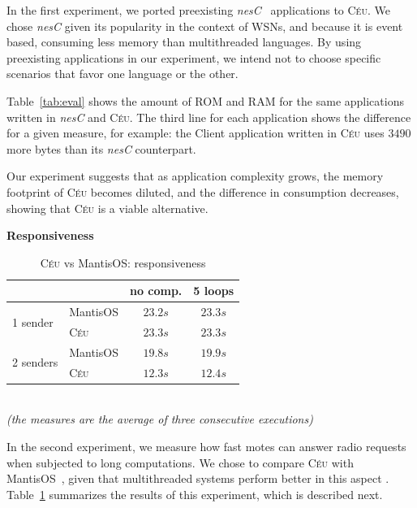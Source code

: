 \documentclass[11pt,a4paper]{article}
\newcommand{\2}{\;\;}
\newcommand{\5}{\;\;\;\;\;}
\newcommand{\CEU}{\textsc{C\'{e}u}}
\newcommand{\nesc}{\emph{nesC}}
\begin{document}
In the first experiment, we ported preexisting \nesc{}~\cite{wsn.nesc} 
applications to \CEU.
We chose \nesc{} given its popularity in the context of WSNs, and because it is 
event based, consuming less memory than multithreaded languages.
By using preexisting applications in our experiment, we intend not to choose 
specific scenarios that favor one language or the other.

Table~\ref{tab:eval} shows the amount of ROM and RAM for the same applications 
written in \nesc{} and \CEU{}.
The third line for each application shows the difference for a given measure, 
for example: the Client application written in \CEU{} uses $3490$ more bytes 
than its \nesc{} counterpart.

Our experiment suggests that as application complexity grows, the memory 
footprint of \CEU{} becomes diluted, and the difference in consumption 
decreases, showing that \CEU{} is a viable alternative.


\textbf{Responsiveness}

\begin{table}[t]\small
\begin{center}
\begin{tabular}{ | l | l | c | c | }
\hline
\multicolumn{2}{|c|}{}
               & no comp. &    5 loops \\
\hline\hline
\multirow{2}{*}{1 sender}
    & MantisOS &  $23.2s$ &    $23.3s$ \\
    & \CEU     &  $23.3s$ &    $23.3s$ \\
\hline\hline
\multirow{2}{*}{2 senders}
    & MantisOS &  $19.8s$ &   $19.9s$ \\
    & \CEU     &  $12.3s$ &   $12.4s$ \\
\hline
\end{tabular}
\\
{\scriptsize\emph{(the measures are the average of three consecutive 
executions)}}
\caption{\CEU{} vs MantisOS: responsiveness}
\label{tab:resp}
\end{center}
\end{table}

In the second experiment, we measure how fast motes can answer radio requests 
when subjected to long computations.
We chose to compare \CEU{} with MantisOS~\cite{wsn.mantisos}, given that 
multithreaded systems perform better in this aspect \cite{wsn.comparison}.
Table~\ref{tab:resp} summarizes the results of this experiment, which is 
described next.
\end{document}
